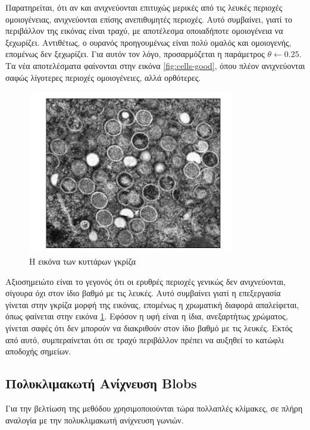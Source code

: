 \documentclass{article}
\newcommand{\eng}[1]{\foreignlanguage{english}{#1}}
\begin{document}
Παρατηρείται, ότι αν και ανιχνεύονται επιτυχώς μερικές από τις λευκές περιοχές ομοιογένειας, ανιχνεύονται επίσης ανεπιθυμητές περιοχές. Αυτό συμβαίνει, γιατί το περιβάλλον της εικόνας είναι τραχύ, με αποτέλεσμα οποιαδήποτε ομοιογένεια να ξεχωρίζει. Αντιθέτως, ο ουρανός προηγουμένως είναι πολύ ομαλός και ομοιογενής, επομένως δεν ξεχωρίζει. Για αυτόν τον λόγο, προσαρμόζεται η παράμετρος $\theta \leftarrow 0.25$. Τα νέα αποτελέσματα φαίνονται στην εικόνα \ref{fig:cells-good}, όπου πλέον ανιχνεύονται σαφώς λίγοτερες περιοχές ομοιογένειες, αλλά ορθότερες.

\begin{figure}[h]
    \centering
    \includegraphics[width=0.8\textwidth]{../image-plots/images-scaled/cells-gray-scaled.jpg}
    \caption{Η εικόνα των κυττάρων γκρίζα}
    \label{fig:cells-gray}
\end{figure}
\FloatBarrier

Αξιοσημειώτο είναι το γεγονός ότι οι ερυθρές περιοχές γενικώς δεν ανιχνεύονται, σίγουρα όχι στον ίδιο βαθμό με τις λευκές. Αυτό συμβαίνει γιατί η επεξεργασία γίνεται στην γκρίζα μορφή της εικόνας, επομένως η χρωματική διαφορά απαλείφεται, όπως φαίνεται στην εικόνα \ref{fig:cells-gray}. Εφόσον η υφή είναι η ίδια, ανεξαρτήτως χρώματος, γίνεται σαφές ότι δεν μπορούν να διακριθούν στον ίδιο βαθμό με τις λευκές. Εκτός από αυτό, συμπεραίνεται ότι σε τραχύ περιβάλλον πρέπει να αυξηθεί το κατώφλι αποδοχής σημείων.

\subsection{Πολυκλιμακωτή Ανίχνευση \eng{Blobs}}

Για την βελτίωση της μεθόδου χρησιμοποιούνται τώρα πολλαπλές κλίμακες, σε πλήρη αναλογία με την πολυκλιμακωτή ανίχνευση γωνιών.
\end{document}
